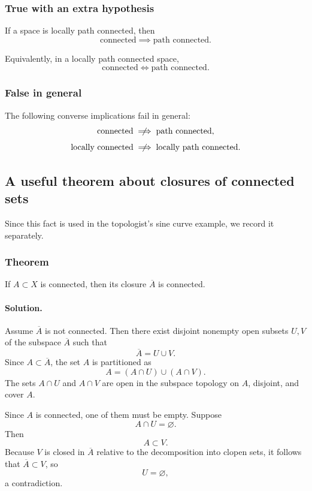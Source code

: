 \documentclass[12pt,a4paper]{article}
\theoremstyle{notespace}
\begin{document}
\subsubsection{True with an extra hypothesis}

If a space is locally path connected, then
\[
\text{connected} \implies \text{path connected}.
\]

Equivalently, in a locally path connected space,
\[
\text{connected} \iff \text{path connected}.
\]

\subsubsection{False in general}

The following converse implications fail in general:
\[
\text{connected} \centernot\implies \text{path connected},
\]
\[
\text{locally connected} \centernot\implies \text{locally path connected}.
\]

\subsection{A useful theorem about closures of connected sets}

Since this fact is used in the topologist's sine curve example, we record it separately.

\subsubsection{Theorem}

If \(A\subset X\) is connected, then its closure \(\overline{A}\) is connected.

\paragraph{\textbf{Solution.}}
Assume \(\overline{A}\) is not connected. Then there exist disjoint nonempty open subsets \(U,V\) of the subspace \(\overline{A}\) such that
\[
\overline{A}=U\cup V.
\]
Since \(A\subset \overline{A}\), the set \(A\) is partitioned as
\[
A=(A\cap U)\cup (A\cap V).
\]
The sets \(A\cap U\) and \(A\cap V\) are open in the subspace topology on \(A\), disjoint, and cover \(A\).

Since \(A\) is connected, one of them must be empty. Suppose
\[
A\cap U=\varnothing.
\]
Then
\[
A\subset V.
\]
Because \(V\) is closed in \(\overline{A}\) relative to the decomposition into clopen sets, it follows that \(\overline{A}\subset V\), so
\[
U=\varnothing,
\]
a contradiction.
\end{document}
